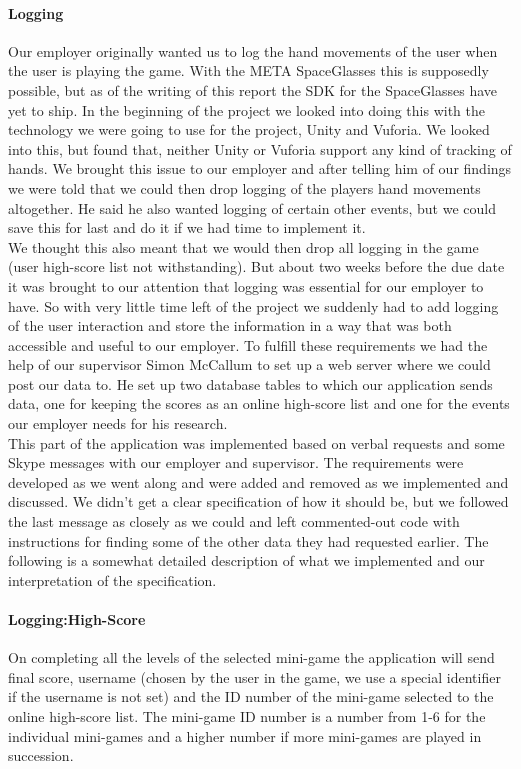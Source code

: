\paragraph{Logging}
Our employer originally wanted us to log the hand movements of the user when the user is playing the game. With the META SpaceGlasses this is supposedly possible, but as of the writing of this report the SDK for the SpaceGlasses have yet to ship. In the beginning of the project we looked into doing this with the technology we were going to use for the project, Unity and Vuforia. We looked into this, but found that, neither Unity or Vuforia support any kind of tracking of hands. We brought this issue to our employer and after telling him of our findings we were told that we could then drop logging of the players hand movements altogether. He said he also wanted logging of certain other events, but we could save this for last and do it if we had time to implement it.
\\
We thought this also meant that we would then drop all logging in the game (user high-score list not withstanding). But about two weeks before the due date it was brought to our attention that logging was essential for our employer to have. So with very little time left of the project we suddenly had to add logging of the user interaction and store the information in a way that was both accessible and useful to our employer.
To fulfill these requirements we had the help of our supervisor Simon McCallum to set up a web server where we could post our data to. He set up two database tables to which our application sends data, one for keeping the scores as an online high-score list and one for the events our employer needs for his research.\\
This part of the application was implemented based on verbal requests and some Skype messages with our employer and supervisor. The requirements were developed as we went along and were added and removed as we implemented and discussed. We didn't get a clear specification of how it should be, but we followed the last message as closely as we could and left commented-out code with instructions for finding some of the other data they had requested earlier. The following is a somewhat detailed description of what we implemented and our interpretation of the specification.
\paragraph{Logging:High-Score}
On completing all the levels of the selected mini-game the application will send final score, username (chosen by the user in the game, we use a special identifier if the username is not set) and the ID number of the mini-game selected to the online high-score list. The mini-game ID number is a number from 1-6 for the individual mini-games and a higher number if more mini-games are played in succession.
